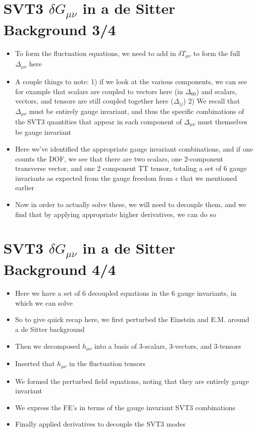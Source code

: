 \documentclass[10pt,letterpaper]{article}
\numberwithin{equation}{section}
\begin{document}

\section{SVT3 $\delta G_{\mu\nu}$ in a de Sitter Background 3/4}
\begin{itemize}
	\item To form the fluctuation equations, we need to add in $\delta T_{\mu\nu}$ to form the full $\Delta_{\mu\nu}$ here
	\item A couple things to note: 
	1) if we look at the various components, we can see for example that scalars are coupled to vectors here (in $\Delta_{00}$) and scalars, vectors, and tensors are still coupled together here ($\Delta_{ij}$)
	2) We recall that $\Delta_{\mu\nu}$ must be entirely gauge invariant, and thus the specific combinations of the SVT3 quantities that appear in each component of $\Delta_{\mu\nu}$ must themselves be gauge invariant
	\item Here we've identified the appropriate gauge invariant combinations, and if one counts the DOF, we see that there are two scalars, one 2-component transverse vector, and one 2 component TT tensor, totaling a set of 6 gauge invariants as expected from the gauge freedom from $\epsilon$ that we mentioned earlier
	\item Now in order to actually solve these, we will need to decouple them, and we find that by applying appropriate higher derivatives, we can do so
\end{itemize}


\section{SVT3 $\delta G_{\mu\nu}$ in a de Sitter Background 4/4}
\begin{itemize}
	\item Here we have a set of 6 decoupled equations in the 6 gauge invariants, in which we can solve 
	\item So to give quick recap here, we first perturbed the Einstein and E.M. around a de Sitter background
	\item Then we decomposed $h_{\mu\nu}$ into a basis of 3-scalars, 3-vectors, and 3-tensors
	\item Inserted that $h_{\mu\nu}$ in the fluctuation tensors
	\item We formed the perturbed field equations, noting that they are entirely gauge invariant
	\item We express the FE's in terms of the gauge invariant SVT3 combinations
	\item Finally applied derivatives to decouple the SVT3 modes
\end{itemize}
  
\end{document}
